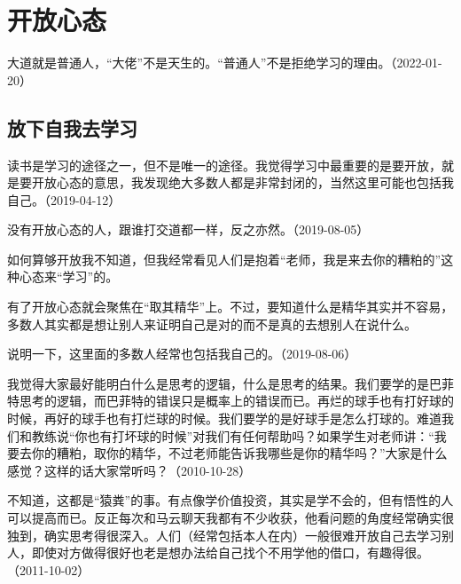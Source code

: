 
\section{开放心态}

大道就是普通人，“大佬”不是天生的。“普通人”不是拒绝学习的理由。（2022-01-20）

\subsection{放下自我去学习}

读书是学习的途径之一，但不是唯一的途径。我觉得学习中最重要的是要开放，就是要开放心态的意思，我发现绝大多数人都是非常封闭的，当然这里可能也包括我自己。（2019-04-12）


没有开放心态的人，跟谁打交道都一样，反之亦然。（2019-08-05）


如何算够开放我不知道，但我经常看见人们是抱着“老师，我是来去你的糟粕的”这种心态来“学习”的。

有了开放心态就会聚焦在“取其精华”上。不过，要知道什么是精华其实并不容易，多数人其实都是想让别人来证明自己是对的而不是真的去想别人在说什么。

说明一下，这里面的多数人经常也包括我自己的。（2019-08-06）


我觉得大家最好能明白什么是思考的逻辑，什么是思考的结果。我们要学的是巴菲特思考的逻辑，而巴菲特的错误只是概率上的错误而已。再烂的球手也有打好球的时候，再好的球手也有打烂球的时候。我们要学的是好球手是怎么打球的。难道我们和教练说“你也有打坏球的时候”对我们有任何帮助吗？如果学生对老师讲：“我要去你的糟粕，取你的精华，不过老师能告诉我哪些是你的精华吗？”大家是什么感觉？这样的话大家常听吗？（2010-10-28）


不知道，这都是“猿粪”的事。有点像学价值投资，其实是学不会的，但有悟性的人可以提高而已。反正每次和马云聊天我都有不少收获，他看问题的角度经常确实很独到，确实思考得很深入。人们（经常包括本人在内）一般很难开放自己去学习别人，即使对方做得很好也老是想办法给自己找个不用学他的借口，有趣得很。（2011-10-02）


